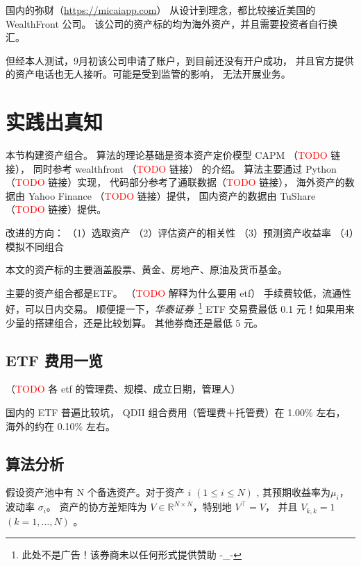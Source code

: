 \documentclass[a4paper, 11pt, UTF8]{report}
\begin{document}
国内的弥财（\underline{https://micaiapp.com}）
从设计到理念，都比较接近美国的 WealthFront 公司。
该公司的资产标的均为海外资产，并且需要投资者自行换汇。

但经本人测试，9月初该公司申请了账户，到目前还没有开户成功，
并且官方提供的资产电话也无人接听。可能是受到监管的影响，
无法开展业务。



\chapter{实践出真知}


本节构建资产组合。
算法的理论基础是资本资产定价模型 CAPM （\textcolor{red}{TODO} 链接），
同时参考 wealthfront （\textcolor{red}{TODO} 链接） 的介绍。
算法主要通过 Python （\textcolor{red}{TODO} 链接）实现，
代码部分参考了通联数据（\textcolor{red}{TODO} 链接），
海外资产的数据由 Yahoo Finance （\textcolor{red}{TODO} 链接）提供，
国内资产的数据由 TuShare （\textcolor{red}{TODO} 链接）提供。

改进的方向：
（1）选取资产
（2）评估资产的相关性
（3）预测资产收益率
（4）模拟不同组合

本文的资产标的主要涵盖股票、黄金、房地产、原油及货币基金。

主要的资产组合都是ETF。
（\textcolor{red}{TODO} 解释为什么要用 etf）
手续费较低，流通性好，可以日内交易。
顺便提一下，\emph{华泰证券}~\footnote{此处不是广告！该券商未以任何形式提供赞助 -\_- }
 ETF 交易费最低 0.1 元！如果用来少量的搭建组合，还是比较划算。
其他券商还是最低 5 元。



\section{ETF 费用一览}

（\textcolor{red}{TODO} 各 etf 的管理费、规模、成立日期，管理人）

国内的 ETF 普遍比较坑，
QDII 组合费用（管理费＋托管费）在 1.00\% 左右，
海外的约在 0.10\% 左右。

\section{算法分析}

假设资产池中有 N 个备选资产。对于资产 $i$ $(1 \le i \le N)$ , 
其预期收益率为$\mu_i$，波动率 $\sigma_i$。 
资产的协方差矩阵为 $V \in \mathbb{R}^{N\times N}$，特别地 $V^\top = V$，
并且 $V_{k,k} = 1$ $(k=1, \ldots, N)$ 。
\end{document}
